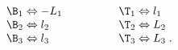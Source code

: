 \begin{equation}
\label{e5:60}
\begin{array}{ll}
\B_1 \Leftrightarrow -L_1 & \quad \quad\quad \quad \T_1 \Leftrightarrow l_1 \\ 
\B_2 \Leftrightarrow l_2 & \quad \quad \quad \quad \T_2 \Leftrightarrow L_2 \\
\B_3 \Leftrightarrow l_3 & \quad \quad \quad \quad \T_3 \Leftrightarrow L_3 \; .
\end{array}
\end{equation}

